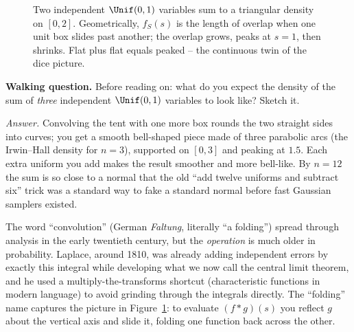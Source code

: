 \begin{figure}[H]
\centering
{}
\caption{Two independent $\Unif(0,1)$ variables sum to a triangular
density on $[0,2]$. Geometrically, $f_S(s)$ is the length of overlap when
one unit box slides past another; the overlap grows, peaks at $s=1$, then
shrinks. Flat plus flat equals peaked -- the continuous twin of the dice
picture.}
\label{ch17:fig-tent}
\end{figure}

\begin{walkbox}
\textbf{Walking question.} Before reading on: what do you expect the
density of the sum of \emph{three} independent $\Unif(0,1)$ variables to
look like? Sketch it.

\emph{Answer.} Convolving the tent with one more box rounds the two
straight sides into curves; you get a smooth bell-shaped piece made of
three parabolic arcs (the Irwin--Hall density for $n=3$), supported on
$[0,3]$ and peaking at $1.5$. Each extra uniform you add makes the result
smoother and more bell-like. By $n=12$ the sum is so close to a normal
that the old ``add twelve uniforms and subtract six'' trick was a standard
way to fake a standard normal before fast Gaussian samplers existed.
\end{walkbox}

\begin{historybox}
The word ``convolution'' (German \emph{Faltung}, literally ``a folding'')
spread through analysis in the early twentieth century, but the
\emph{operation} is much older in probability. Laplace, around 1810, was
already adding independent errors by exactly this integral while developing
what we now call the central limit theorem, and he used a
multiply-the-transforms shortcut (characteristic functions in modern
language) to avoid grinding through the integrals directly. The ``folding''
name captures the picture in Figure~\ref{ch17:fig-tent}: to evaluate
$(f*g)(s)$ you reflect $g$ about the vertical axis and slide it, folding
one function back across the other.
\end{historybox}

